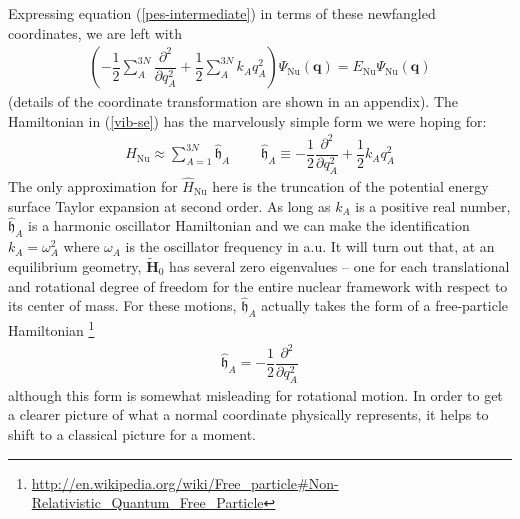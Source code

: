 \documentclass[11pt]{article}
\newcommand{\bo}[1]{\ensuremath{\mathbf{#1}}}
\newcommand{\tl}[1]{\ensuremath{\tilde{#1}}}
\renewcommand{\sp}{\ \ \ \ \ \ \ \ \ \ }
\newcommand{\fr}[2]{\dfrac{#1}{#2}}
\newcommand{\pr}[1]{\left(#1\right)}
\newcommand{\pd}[3]{\ensuremath{ \dfrac{ \partial^{#1} #2 }{\partial #3 ^{#1}}}}
\newcommand{\Nu}{\ensuremath{\mathrm{Nu}}}
\newcommand{\op}[1]{\ensuremath{\hat{#1}}}
\newcommand{\Y}{\ensuremath{\Psi}}
\newcommand{\w}{\ensuremath{\omega}}
\newcommand{\mf}[1]{\ensuremath{\mathfrak{#1}}}
\begin{document}
Expressing equation (\ref{pes-intermediate}) in terms of these newfangled
coordinates, we are left with 
\begin{align}
\label{vib-se}
\pr{
-\fr{1}{2}\sum_A^{3N}
    \pd{2}{}{q_A}
+\fr{1}{2}\sum_A^{3N}
    k_A q_A^2
}
    \Y_\Nu(\bo{q})
=
    E_\Nu
    \Y_\Nu(\bo{q})
\end{align}
(details of the coordinate transformation are shown in an appendix). The
Hamiltonian in (\ref{vib-se}) has the marvelously simple form we were hoping
for:
\begin{align}
\label{harm-hamiltonian}
    \op{H}_\Nu
\approx
    \sum_{A=1}^{3N}
    \op{\mf{h}}_A
\sp
    \op{\mf{h}}_A
\equiv
-\fr{1}{2}
    \pd{2}{}{q_A}
+\fr{1}{2}
    k_A q_A^2
\end{align}
The only approximation for $\op{H}_\Nu$ here is the truncation of the potential
energy surface Taylor expansion at second order. As long as $k_A$ is a
positive real number, $\op{\mf{h}}_A$ is a harmonic oscillator Hamiltonian and
we can make the identification $k_A=\w_A^2$ where $\w_A$ is the oscillator
frequency in a.u. It will turn out that, at an equilibrium geometry,
$\tl{\bo{H}}_0$ has several zero eigenvalues -- one for each translational and
rotational degree of freedom for the entire nuclear framework with respect to
its center of mass. For these motions, $\op{\mf{h}}_A$ actually takes the form
of a free-particle Hamiltonian
\footnote{\url{http://en.wikipedia.org/wiki/Free_particle\#Non-Relativistic_Quantum_Free_Particle}}
\begin{align}
    \op{\mf{h}}_A
    = -\fr{1}{2} \pd{2}{}{q_A}
\end{align}
although this form is somewhat misleading for rotational motion. In order to
get a clearer picture of what a normal coordinate physically represents, it
helps to shift to a classical picture for a moment.
\end{document}
